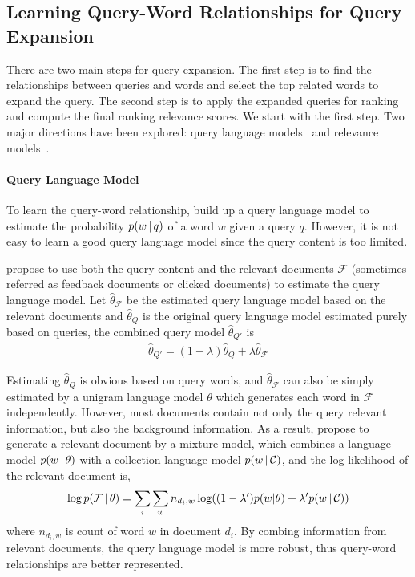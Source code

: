 \subsection{Learning Query-Word Relationships for Query Expansion}

There are two main steps for query expansion. The first step is to
find the relationships between queries and words and select the top
related words to expand the query. The second step is to apply the
expanded queries for ranking and compute the final ranking relevance
scores. We start with the first step. Two major directions have been
explored: query language models~\citep{zhai-01b} and relevance
models~\citep{Lavrenko-2001}.

\paragraph{Query Language Model}

To learn the query-word relationship, \citet{zhai-01b} build up a query
language model to estimate the probability $p(w \, | \, q)$ of a word $w$
given a query $q$. However, it is not easy to learn a good query
language model since the query content is too limited.

\citet{zhai-01b} propose to use both the query content and the relevant
documents $\mathcal{F}$ (sometimes referred as feedback documents or clicked
documents) to estimate the query language model. Let
$\hat{\theta}_{\mathcal{F}}$ be the estimated query language model
based on the relevant documents and $\hat{\theta}_{Q}$ is the original query language model estimated purely based on queries,
the combined query model $\hat{\theta}_{Q'}$ is
\begin{align}
\label{eq:qlm-comb}
\hat{\theta}_{Q'} = (1 - \lambda)\hat{\theta}_{Q} + \lambda \hat{\theta}_{\mathcal{F}}
\end{align}

Estimating $\hat{\theta}_{Q}$ is obvious based on query words, and $\hat{\theta}_{\mathcal{F}}$ can
also be simply estimated by a unigram language model $\theta$
which generates each word in $\mathcal{F}$ independently. However,
most documents contain not only the query relevant information, but
also the background information. As a result, \citet{zhai-01b} propose
to generate a relevant document by a mixture model, which combines a
language model $p(w \, | \, \theta)$ with a collection language model
$p(w \, | \, \mathcal{C})$, and the log-likelihood of the relevant document
is,
\begin{align}
\log p(\mathcal{F} \, | \, \theta) = \sum_i \sum_w n_{d_i, w}
  \log((1-\lambda')p(w|\theta) + \lambda' p(w \, | \, \mathcal{C}))
\end{align}
where $n_{d_i, w}$ is count of word $w$ in document $d_i$.  By combing
information from relevant documents, the query language model is
more robust, thus query-word relationships are better represented.

